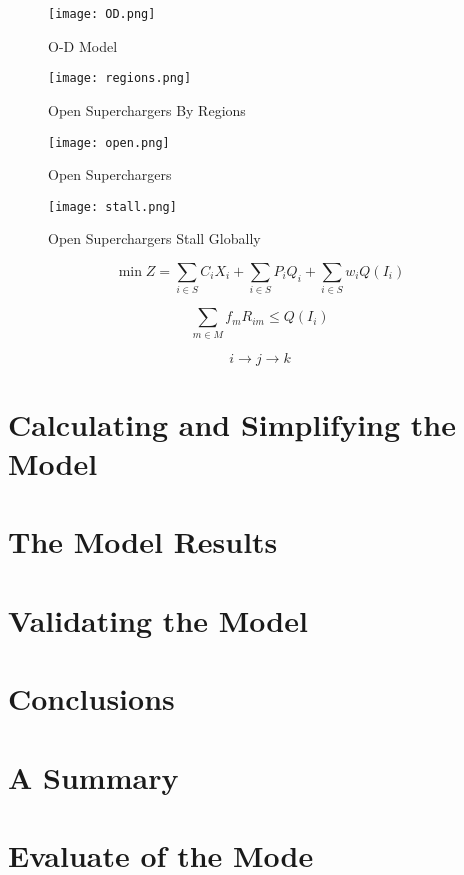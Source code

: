\documentclass{mcmthesis}
\begin{document}
\begin{figure}[h]
\small
\centering
\texttt{[image: OD.png]}
\caption{O-D Model} 
\end{figure}


\begin{figure}[h]
\small
\centering
\texttt{[image: regions.png]}
\caption{Open Superchargers By Regions} 
\end{figure}


\begin{figure}[h]
\small
\centering
\texttt{[image: open.png]}
\caption{Open Superchargers} 
\end{figure}


\begin{figure}[h]
\small
\centering
\texttt{[image: stall.png]}
\caption{Open Superchargers Stall Globally} 
\end{figure}

\[
\min Z=\sum _{i\in S}C_{i}X_{i} + \sum _{i\in S}P_{i}Q_{i} + \sum _{i\in S}w_{i}Q\left( I_{i}\right)
\]

\[	
\sum _{m\in M}f_{m}R_{im} \leq Q\left( I_{i}\right)
\]

\[
i\rightarrow j\rightarrow k
\]


\section{Calculating and Simplifying the Model  }

\section{The Model Results}


\section{Validating the Model}


\section{Conclusions}


\section{A Summary}


\section{Evaluate of the Mode}
\end{document}
